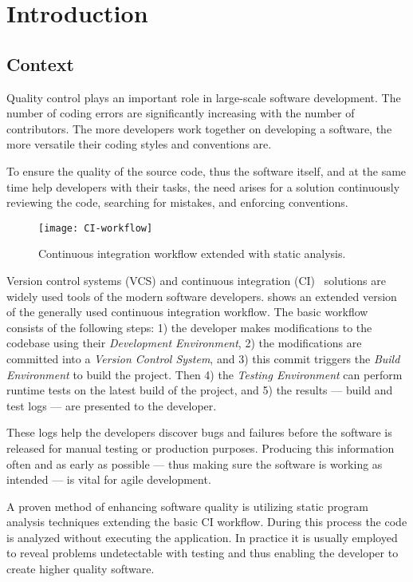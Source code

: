 \chapter{Introduction}
\label{chap:introduction}

\section{Context}
Quality control plays an important role in large-scale software development. The number of coding errors are significantly increasing with the number of contributors. The more developers work together on developing a software, the more versatile their coding styles and conventions are.

To ensure the quality of the source code, thus the software itself, and at the same time help developers with their tasks, the need arises for a solution continuously reviewing the code, searching for mistakes, and enforcing conventions.

\begin{figure}[!ht]
	\centering
	\texttt{[image: CI-workflow]}
	\caption{Continuous integration workflow extended with static analysis.}
	\label{fig:CI-workflow}
\end{figure}

Version control systems (VCS) and continuous integration (CI)~\cite{CI} solutions are widely used tools of the modern software developers.  shows an extended version of the generally used continuous integration workflow.
The basic workflow consists of the following steps: 1) the developer makes modifications to the codebase using their \textit{Development Environment}, 2) the modifications are committed into a \textit{Version Control System}, and 3) this commit triggers the \textit{Build Environment} to build the project. Then 4) the \textit{Testing Environment} can perform runtime tests on the latest build of the project, and 5) the results --- build and test logs --- are presented to the developer.

These logs help the developers discover bugs and failures before the software is released for manual testing or production purposes. Producing this information often and as early as possible --- thus making sure the software is working as intended --- is vital for agile development.

A proven method of enhancing software quality is utilizing static program analysis techniques extending the basic CI workflow. During this process the code is analyzed without executing the application. In practice it is usually employed to reveal problems undetectable with testing and thus enabling the developer to create higher quality software.


